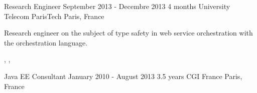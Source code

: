 \documentclass[a4paper]{article}
\begin{document}

\cvexperiencetitle
{Research Engineer}
{September 2013 - Decembre 2013}
{4 months}
{University Telecom ParisTech}
{Paris, France}

\begin{cvexperience}%
  Research engineer on the subject of type safety in web service orchestration
  with the  orchestration language.

  \begin{cvexperiencetech}[Technologies]%
    ,
    ,
  \end{cvexperiencetech}
\end{cvexperience}


\cvexperiencetitle
{Java EE Consultant}
{January 2010 - August 2013}
{3.5 years}
{CGI France}
{Paris, France}
\end{document}
